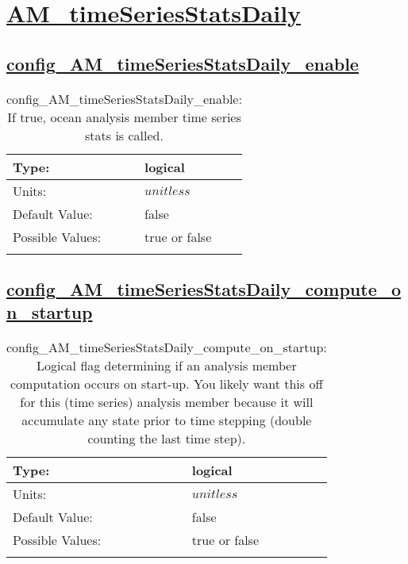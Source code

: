 \section[AM\_timeSeriesStatsDaily]{\hyperref[sec:nm_tab_AM_timeSeriesStatsDaily]{AM\_timeSeriesStatsDaily}}
\label{sec:nm_sec_AM_timeSeriesStatsDaily}
\subsection[config\_AM\_timeSeriesStatsDaily\_enable]{\hyperref[sec:nm_tab_AM_timeSeriesStatsDaily]{config\_AM\_timeSeriesStatsDaily\_enable}}
\label{subsec:nm_sec_config_AM_timeSeriesStatsDaily_enable}
\begin{center}
\begin{longtable}{| p{2.0in} || p{4.0in} |}
    \hline
    Type: & logical \\
    \hline
    Units: & $unitless$ \\
    \hline
    Default Value: & false \\
    \hline
    Possible Values: & true or false \\
    \hline
    \caption{config\_AM\_timeSeriesStatsDaily\_enable: If true, ocean analysis member time series stats is called.}
\end{longtable}
\end{center}
\subsection[config\_AM\_timeSeriesStatsDaily\_compute\_on\_startup]{\hyperref[sec:nm_tab_AM_timeSeriesStatsDaily]{config\_AM\_timeSeriesStatsDaily\_compute\_on\_startup}}
\label{subsec:nm_sec_config_AM_timeSeriesStatsDaily_compute_on_startup}
\begin{center}
\begin{longtable}{| p{2.0in} || p{4.0in} |}
    \hline
    Type: & logical \\
    \hline
    Units: & $unitless$ \\
    \hline
    Default Value: & false \\
    \hline
    Possible Values: & true or false \\
    \hline
    \caption{config\_AM\_timeSeriesStatsDaily\_compute\_on\_startup: Logical flag determining if an analysis member computation occurs on start-up. You likely want this off for this (time series) analysis member because it will accumulate any state prior to time stepping (double counting the last time step).}
\end{longtable}
\end{center}
